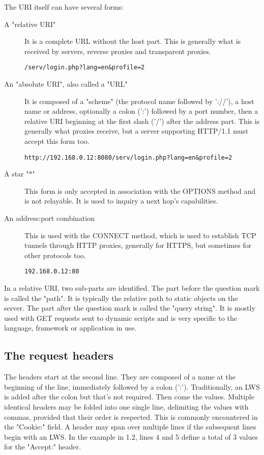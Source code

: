The URI itself can have several forms:

\begin{description}
\item[A "relative URI"]
    It is a complete URL without the host part. This is generally what is
    received by servers, reverse proxies and transparent proxies.
    
    \verb|/serv/login.php?lang=en&profile=2|

\item[An "absolute URI", also called a "URL"]
    It is composed of a "scheme" (the protocol name followed by '://'), a host
    name or address, optionally a colon (':') followed by a port number, then
    a relative URI beginning at the first slash ('/') after the address part.
    This is generally what proxies receive, but a server supporting HTTP/1.1
    must accept this form too.
    
    \verb|http://192.168.0.12:8080/serv/login.php?lang=en&profile=2|

\item[A star "*"]
    This form is only accepted in association with the OPTIONS
    method and is not relayable. It is used to inquiry a next hop's
    capabilities.

\item[An address:port combination]
    This is used with the CONNECT method, which is used to establish TCP
    tunnels through HTTP proxies, generally for HTTPS, but sometimes for
    other protocols too.
    
    \verb|192.168.0.12:80|
\end{description}

In a relative URI, two sub-parts are identified. The part before the question
mark is called the "path". It is typically the relative path to static objects
on the server. The part after the question mark is called the "query string".
It is mostly used with GET requests sent to dynamic scripts and is very
specific to the language, framework or application in use.

\subsection{The request headers}
The headers start at the second line. They are composed of a name at the
beginning of the line, immediately followed by a colon (':'). Traditionally,
an LWS is added after the colon but that's not required. Then come the values.
Multiple identical headers may be folded into one single line, delimiting the
values with commas, provided that their order is respected. This is commonly
encountered in the "Cookie:" field. A header may span over multiple lines if
the subsequent lines begin with an LWS. In the example in 1.2, lines 4 and 5
define a total of 3 values for the "Accept:" header.


